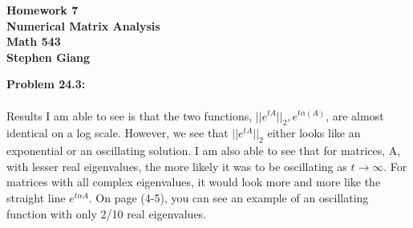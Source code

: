 \documentclass[12pt]{article}
\begin{document}
	
	\begin{center}
		\textbf{Homework 7} \\
		\textbf{Numerical Matrix Analysis} \\
		\textbf{Math 543} \\
		\textbf{Stephen Giang} \\
	\end{center}

\noindent \textbf{Problem 24.3: }
\\ \\
Results I am able to see is that the two functions, $||e^{tA}||_2, e^{t\alpha(A)}$, are almost identical on a log scale. However, we see that $||e^{tA}||_2$ either looks like an exponential or an oscillating solution. I am also able to see that for matrices, A, with lesser real eigenvalues, the more likely it was to be oscillating as $t \rightarrow \infty$.  For matrices with all complex eigenvalues, it would look more and more like the straight line $e^{t\alpha A}$. On page (4-5), you can see an example of an oscillating function with only 2/10 real eigenvalues.
\end{document}
